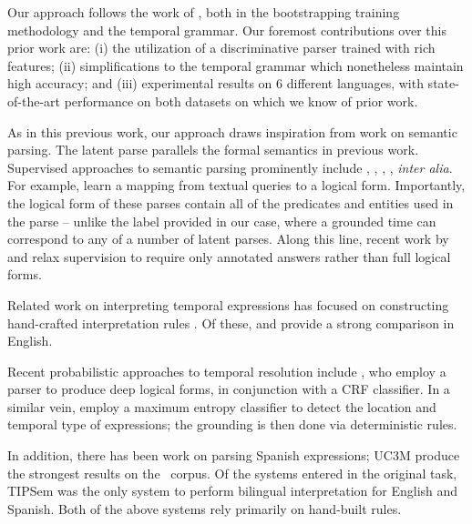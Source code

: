 Our approach follows the work of \me, both in the bootstrapping training
  methodology and the temporal grammar.
Our foremost contributions over this prior work are:
  (i) the utilization of a discriminative parser trained with rich features;
  (ii) simplifications to the temporal grammar which nonetheless maintain
       high accuracy;
  and
  (iii) experimental results on 6 different languages, with state-of-the-art
        performance on both datasets on which we know of prior work.

As in this previous work,
  our approach draws inspiration from work on semantic parsing.
The latent parse parallels the formal semantics in previous work.
Supervised approaches to semantic parsing prominently include
	,
	,
	, 
	, 
	\textit{inter alia}.
For example,  learn a mapping from
	textual queries to a logical form.
Importantly, the logical form of these parses contain all of the predicates
  and entities used in the parse -- unlike the label provided in our case,
  where a grounded time can correspond to any of a number of latent parses.
Along this line, recent work by  and 
	 relax supervision 
	to require only annotated answers rather than full logical forms.

Related work on interpreting temporal expressions has focused on constructing
	hand-crafted interpretation rules
	\cite{key:2000mani-temporal,key:2003saquete-temporal,key:2004puscasu-temporal,key:2010grover-temporal}.  
Of these,  \cite{key:2010strotgen-temporal} and
	 \cite{key:2012chang-temporal} provide a strong
	comparison in English.

Recent probabilistic approaches to temporal resolution include
	,    %
	who employ a parser to produce deep logical forms, in conjunction with
	a CRF classifier.
In a similar vein,
	employ a maximum entropy classifier to detect the location and temporal
	type of expressions; the grounding is then done via deterministic rules.
	
In addition, there has been work on parsing Spanish expressions;
  UC3M \cite{2010vicente-uc3m} produce the strongest results on the
  \tempeval\ corpus.
Of the systems entered in the original task,
  TIPSem \cite{key:2010llorens-tipsem} was the only system to perform bilingual
  interpretation for English and Spanish.
Both of the above systems rely primarily on hand-built rules.



